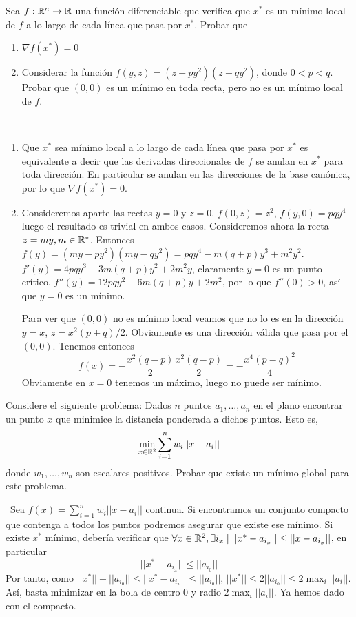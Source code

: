 \documentclass[twoside]{article}
\begin{document}
\begin{ejercicio}{3}
Sea $f:\mathbb{R}^n\to\mathbb{R}$ una función diferenciable que verifica que $x^*$ es un mínimo local de $f$ a lo largo de cada línea que pasa por $x^*$. Probar que 
\begin{enumerate}
\item $\nabla f(x^*)=0$
\item Considerar la función $f(y,z)=(z-py^2)(z-qy^2)$, donde $0<p<q$. Probar que $(0,0)$ es un mínimo en toda recta, pero no es un mínimo local de $f$.
\end{enumerate}

\begin{solucion}\
\begin{enumerate}
\item Que $x^*$ sea mínimo local a lo largo de cada línea que pasa por $x^*$ es equivalente a decir que las derivadas direccionales de $f$ se anulan en $x^*$ para toda dirección. En particular se anulan en las direcciones de la base canónica, por lo que $\nabla f(x^*)=0$. 
\item Consideremos aparte las rectas $y=0$ y $z=0$. $f(0,z)=z^2$, $f(y,0)=pqy^4$ luego el resultado es trivial en ambos casos. Consideremos ahora la recta $z=my, m\in\mathbb{R}^*$. Entonces $f(y)=(my-py^2)(my-qy^2)= pqy^4-m(q+p)y^3 +m^2y^2$. $f'(y)=4pqy^3-3m(q+p)y^2+2m^2y$, claramente $y=0$ es un punto crítico. $f''(y)=12pqy^2-6m(q+p)y+2m^2$, por lo que $f''(0)>0$, así que $y=0$ es un mínimo. 

Para ver que $(0,0)$ no es mínimo local veamos que no lo es en la dirección $y=x$, $z=x^2(p+q)/2$. Obviamente es una dirección válida que pasa por el $(0,0)$. Tenemos entonces 
$$
f(x) = -\frac{x^2(q-p)}{2}\frac{x^2(q-p)}{2} = -\frac{x^4(p-q)^2}{4}
$$
Obviamente en $x=0$ tenemos un máximo, luego no puede ser mínimo.
\end{enumerate}
\end{solucion}
\end{ejercicio}

\newpage 

\begin{ejercicio}{4}
Considere el siguiente problema:
Dados $n$ puntos $a_1,\dots,a_n$ en el plano encontrar un punto $x$ que minimice la distancia ponderada a dichos puntos. Esto es,
$$\min_{x\in\mathbb{R}^2}\sum_{i=1}^nw_i||x-a_i||$$
donde $w_1,\dots,w_n$ son escalares positivos. Probar que existe un mínimo global para este problema. 
\begin{solucion}\
Sea $f(x)=\sum_{i=1}^nw_i||x-a_i||$ continua. Si encontramos un conjunto compacto que contenga a todos los puntos podremos asegurar que existe ese mínimo. Si existe $x^*$ mínimo, debería verificar que $\forall x\in\mathbb{R}^2, \exists i_x\mid ||x^*-a_{i_x}||\leq ||x-a_{i_x}||$, en particular $$||x^*-a_{i_x}||\leq ||a_{i_0}||$$
Por tanto, como $||x^*||-||a_{i_0}||\leq ||x^*-a_{i_x}||\leq ||a_{i_0}||$, $||x^*||\leq 2||a_{i_0}||\leq 2\max_i{||a_i||}$. Así, basta minimizar en la bola de centro 0 y radio $2\max_i{||a_i||}$. Ya hemos dado con el compacto.
\end{solucion}
\end{ejercicio}
\end{document}
